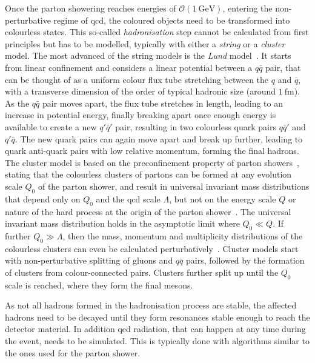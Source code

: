 Once the parton showering reaches energies of $\mathcal{O}(\SI{1}{\GeV})$, entering the non-perturbative regime of \gls{qcd}, the coloured objects need to be transformed into colourless states. This so-called \textit{hadronisation} step cannot be calculated from first principles but has to be modelled, typically with either a \textit{string} or a \textit{cluster} model. The most advanced of the string models is the \textit{Lund} model~\cite{Andersson:1983ia,andersson_1998}. It starts from linear confinement and considers a linear potential between a $q\bar{q}$ pair, that can be thought of as a uniform colour flux tube stretching between the $q$ and $\bar{q}$, with a transverse dimension of the order of typical hadronic size (\ie around $\SI{1}{\femto\meter}$). As the $q\bar{q}$ pair moves apart, the flux tube stretches in length, leading to an increase in potential energy, finally breaking apart once enough energy is available to create a new $q'\bar{q}'$ pair, resulting in two colourless quark pairs $q\bar{q}'$ and $q'\bar{q}$. The new quark pairs can again move apart and break up further, leading to quark anti-quark pairs with low relative momentum, forming the final hadrons. The cluster model is based on the preconfinement property of parton showers~\cite{Amati:1979fg}, stating that the colourless clusters of partons can be formed at any evolution scale $Q_0$ of the parton shower, and result in universal invariant mass distributions that depend only on $Q_0$ and the \gls{qcd} scale $\Lambda$, but not on the energy scale $Q$ or nature of the hard process at the origin of the parton shower~\cite{Buckley:2011ms}. The universal invariant mass distribution holds in the asymptotic limit where $Q_0 \ll Q$. If further $Q_0 \gg \Lambda$, then the mass, momentum and multiplicity distributions of the colourless clusters can even be calculated perturbatively~\cite{Buckley:2011ms}. Cluster models start with non-perturbative splitting of gluons and $q\bar{q}$ pairs, followed by the formation of clusters from colour-connected pairs. Clusters further split up until the $Q_0$ scale is reached, where they form the final mesons.

 As not all hadrons formed in the hadronisation process are stable, the affected hadrons need to be decayed until they form resonances stable enough to reach the detector material. In addition \gls{qed} radiation, that can happen at any time during the event, needs to be simulated. This is typically done with algorithms similar to the ones used for the parton shower.
 
